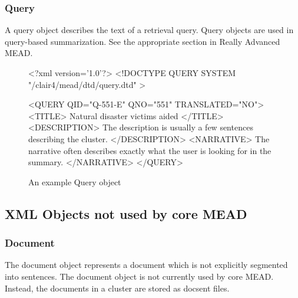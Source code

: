 \documentclass[10pt]{article}
\begin{document}
\subsubsection {Query}

A query object describes the text of a retrieval query.
Query objects are used in query-based summarization.  See 
the appropriate section in Really Advanced MEAD.

\begin{figure}[htp!]
\centering
\begin{boxedverbatim}
<?xml version='1.0'?>
<!DOCTYPE QUERY SYSTEM "/clair4/mead/dtd/query.dtd" >

<QUERY QID="Q-551-E" QNO="551" TRANSLATED="NO">
<TITLE>
Natural disaster victims aided
</TITLE>
<DESCRIPTION>
The description is usually a few sentences describing the 
cluster.
</DESCRIPTION>
<NARRATIVE>
The narrative often describes exactly what the user is looking
for in the summary.
</NARRATIVE>
</QUERY>
\end{boxedverbatim}
\caption{An example Query object}
\label{figure:query-example}
\end{figure}





\subsection{XML Objects not used by core MEAD}

\subsubsection {Document}

The document object represents a document which is not explicitly
segmented into sentences.
The document object is not currently used by core MEAD.  
Instead, the documents in a cluster are stored as docsent files.
\end{document}
